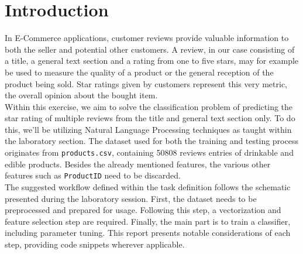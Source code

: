 \section{Introduction}
In E-Commerce applications, customer reviews provide valuable information to both the seller and potential other customers. A review, in our case consisting of a title, a general text section and a rating from one to five stars, may for example be used to measure the quality of a product or the general reception of the product being sold. Star ratings given by customers represent this very metric, the overall opinion about the bought item.\\

Within this exercise, we aim to solve the classification problem of predicting the star rating of multiple reviews from the title and general text section only. To do this, we'll be utilizing Natural Language Processing techniques as taught within the laboratory section. The dataset used for both the training and testing process originates from \texttt{products.csv}, containing 50808 reviews entries of drinkable and edible products. Besides the already mentioned features, the various other features such as \texttt{ProductID} need to be discarded. \\

The suggested workflow defined within the task definition follows the schematic presented during the laboratory session. First, the dataset needs to be preprocessed and prepared for usage. Following this step, a vectorization and feature selection step are required. Finally, the main part is to train a classifier, including parameter tuning. This report presents notable considerations of each step, providing code snippets wherever applicable.